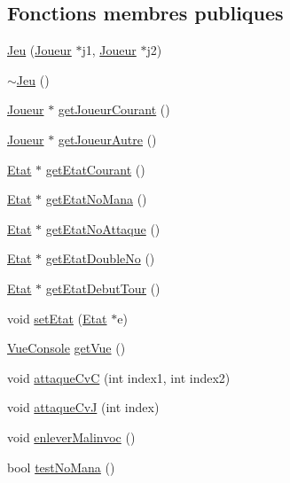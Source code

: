 \subsection*{\-Fonctions membres publiques}
\begin{DoxyCompactItemize}
\item 
\hyperlink{class_jeu_a3033d02a2ec0e17b170b0735393d716e}{\-Jeu} (\hyperlink{class_joueur}{\-Joueur} $\ast$j1, \hyperlink{class_joueur}{\-Joueur} $\ast$j2)
\item 
\hyperlink{class_jeu_a9cd19e73df169d7f09397be61ba8548c}{$\sim$\-Jeu} ()
\item 
\hyperlink{class_joueur}{\-Joueur} $\ast$ \hyperlink{class_jeu_a676f11e6bda0cde27f128e90cbaae765}{get\-Joueur\-Courant} ()
\item 
\hyperlink{class_joueur}{\-Joueur} $\ast$ \hyperlink{class_jeu_aeaa0f199d6a1c9271a49b226159dd1ca}{get\-Joueur\-Autre} ()
\item 
\hyperlink{class_etat}{\-Etat} $\ast$ \hyperlink{class_jeu_a6a84bec16f8075c1c9b867096dfc2b06}{get\-Etat\-Courant} ()
\item 
\hyperlink{class_etat}{\-Etat} $\ast$ \hyperlink{class_jeu_a6af6b2d0bd215cde1d63dbe3e799b291}{get\-Etat\-No\-Mana} ()
\item 
\hyperlink{class_etat}{\-Etat} $\ast$ \hyperlink{class_jeu_a4935a721a0e230cebae3905c78f3721f}{get\-Etat\-No\-Attaque} ()
\item 
\hyperlink{class_etat}{\-Etat} $\ast$ \hyperlink{class_jeu_a94fc4b05a1d532795b4c8a5d0fec4003}{get\-Etat\-Double\-No} ()
\item 
\hyperlink{class_etat}{\-Etat} $\ast$ \hyperlink{class_jeu_a8ae205a6a9d95ec5bed20e2fdf5c74a7}{get\-Etat\-Debut\-Tour} ()
\item 
void \hyperlink{class_jeu_a0e5e13b72cd123ac0afef1fa001c9d5f}{set\-Etat} (\hyperlink{class_etat}{\-Etat} $\ast$e)
\item 
\hyperlink{class_vue_console}{\-Vue\-Console} \hyperlink{class_jeu_a6a98e2284176a68e9096a331d7da75e7}{get\-Vue} ()
\item 
void \hyperlink{class_jeu_a86087ecade936bff6bad82eb024ba6bf}{attaque\-Cv\-C} (int index1, int index2)
\item 
void \hyperlink{class_jeu_a81b8b7bc79f9df1b1f3c557e04e8c634}{attaque\-Cv\-J} (int index)
\item 
void \hyperlink{class_jeu_a43c11cf6d659b78dd957cfa65d6d5547}{enlever\-Malinvoc} ()
\item 
bool \hyperlink{class_jeu_abbbc59a98fe8296456ddc112faa2b66b}{test\-No\-Mana} ()

\end{DoxyCompactItemize}
